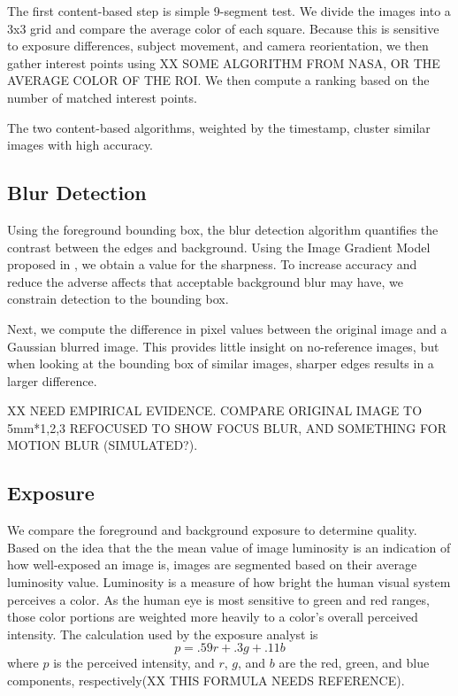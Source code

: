 \documentclass[twocolumn]{article}
\begin{document}
The first content-based step is simple 9-segment test. We divide the images into a 3x3 grid and compare the average color of each square. Because this is sensitive to exposure differences, subject movement, and camera reorientation, we then gather interest points using XX SOME ALGORITHM FROM NASA, OR THE AVERAGE COLOR OF THE ROI. We then compute a ranking based on the number of matched interest points.

The two content-based algorithms, weighted by the timestamp, cluster similar images with high accuracy.

\subsection{Blur Detection}
Using the foreground bounding box, the blur detection algorithm quantifies the contrast between the edges and background. Using the Image Gradient Model proposed in \cite{springerlink:10.1007/978-3-540-77409-9_26}, we obtain a value for the sharpness. To increase accuracy and reduce the adverse affects that acceptable background blur may have, we constrain detection to the bounding box.

Next, we compute the difference in pixel values between the original image and a Gaussian blurred image. This provides little insight on no-reference images, but when looking at the bounding box of similar images, sharper edges results in a larger difference.

XX NEED EMPIRICAL EVIDENCE. COMPARE ORIGINAL IMAGE TO 5mm*{1,2,3} REFOCUSED TO SHOW FOCUS BLUR, AND SOMETHING FOR MOTION BLUR (SIMULATED?).

\subsection{Exposure}
We compare the foreground and background exposure to determine quality. Based on the idea that the the mean value of image luminosity is an indication of how well-exposed an image is, images are segmented based on their average luminosity value.
Luminosity is a measure of how bright the human visual system perceives a color. As the human eye is most sensitive to green and red ranges, those color portions are weighted more heavily to a color's overall perceived intensity. The calculation used by the exposure analyst is
\[
p=.59r+.3g+.11b
\]
where \(p\) is the perceived intensity, and \(r\), \(g\), and \(b\) are the red, green, and blue components, respectively(XX THIS FORMULA NEEDS REFERENCE).
\end{document}
